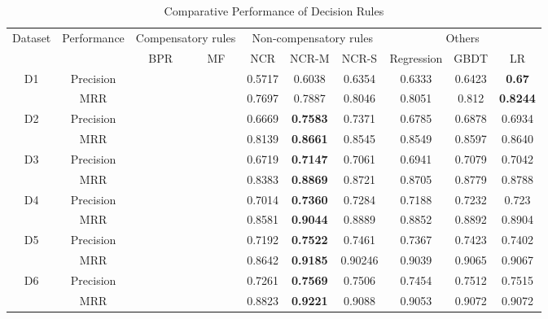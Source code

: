 \documentclass[sigconf]{acmart}
\begin{document}
\begin{table*}[htbp]
\caption{Comparative Performance of Decision Rules }
\label{tab:decision}
\begin{tabular}{|c|c|c|c|c|c|c|c|c|c|}
\hline
\multirow{2}{*}{Dataset} & \multirow{2}{*}{Performance}
& \multicolumn{2}{|c|}{Compensatory rules} & \multicolumn{3}{|c|}{Non-compensatory rules} & \multicolumn{3}{|c|}{Others} \\
\cline{3-10} & & BPR & MF & NCR & NCR-M & NCR-S & Regression & GBDT & LR \\\hline
\multirow{2}{*}{D1} &Precision	& & &	0.5717 & 0.6038 & 0.6354 &	0.6333 & 0.6423 &\bf{0.67}\\
\cline{2-10}	    &MRR		& & &0.7697 & 0.7887 & 0.8046 &0.8051 & 0.812	 &\bf{0.8244}\\\hline
\multirow{2}{*}{D2} &Precision  & & &0.6669 & \bf{0.7583} & 0.7371 &	0.6785 & 0.6878	& 0.6934\\
\cline{2-10}		 &MRR		& & &	0.8139 &\bf{0.8661} & 0.8545 & 0.8549 & 0.8597	& 0.8640\\\hline
\multirow{2}{*}{D3} &Precision & & & 0.6719 & \bf{0.7147} & 0.7061 &	0.6941 & 0.7079 & 0.7042\\
\cline{2-10} 		&MRR		& & & 0.8383 &\bf{0.8869} & 0.8721 & 0.8705 &0.8779 & 0.8788\\\hline
\multirow{2}{*}{D4} &Precision & & & 0.7014 & \bf{0.7360} & 0.7284 & 0.7188 & 0.7232 & 0.723\\
\cline{2-10} 		&MRR		& & & 0.8581& \bf{0.9044} & 0.8889 &	0.8852 & 0.8892& 0.8904\\\hline
\multirow{2}{*}{D5} &Precision	& &&	0.7192 &\bf{0.7522} &0.7461 & 0.7367 & 0.7423 &0.7402\\
\cline{2-10}		 &MRR		& && 0.8642 &\bf{0.9185} & 0.90246 & 0.9039 &	0.9065 & 0.9067\\\hline
\multirow{2}{*}{D6} &Precision	& && 0.7261 &\bf{0.7569} & 0.7506 & 0.7454 & 0.7512 & 0.7515\\
\cline{2-10}   		&MRR		& &&	0.8823& \bf{0.9221} &	0.9088 & 0.9053 & 0.9072 & 0.9072\\\hline
\end{tabular}
\end{table*}
\end{document}
